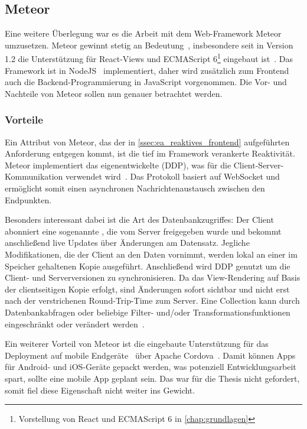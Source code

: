 \subsection{Meteor}
\label{ssec:el_meteor}

Eine weitere Überlegung war es die Arbeit mit dem Web-Framework Meteor
umzusetzen.  Meteor gewinnt stetig an Bedeutung~\cite{hotframeworks},
insbesondere seit in Version 1.2 die Unterstützung für React-Views und
ECMAScript 6\footnote{Vorstellung von React und ECMAScript 6 in
\cref{chap:grundlagen}} eingebaut ist~\cite{meteor12}.  Das Framework ist in
NodeJS~\cite{nodejs} implementiert, daher wird zusätzlich zum Frontend auch die
Backend-Programmierung in JavaScript vorgenommen.  Die Vor- und Nachteile von
Meteor sollen nun genauer betrachtet werden.

\subsubsection{Vorteile}
\label{sssec:elm_vorteile}

Ein Attribut von Meteor, das der in \cref{ssec:ea_reaktives_frontend}
aufgeführten Anforderung entgegen kommt, ist die tief im Framework verankerte
Reaktivität.  Meteor implementiert das eigenentwickelte
 (DDP), was für die
Client-Server-Kommunikation verwendet wird~\cite{ddp}.  Das Protokoll basiert
auf WebSocket und ermöglicht somit einen asynchronen Nachrichtenaustausch
zwischen den Endpunkten.

Besonders interessant dabei ist die Art des Datenbankzugriffes:  Der Client
abonniert eine sogenannte , die vom Server
freigegeben wurde und bekommt anschließend live Updates über Änderungen am
Datensatz.  Jegliche Modifikationen, die der Client an den Daten vornimmt,
werden lokal an einer im Speicher gehaltenen Kopie ausgeführt.  Anschließend
wird DDP genutzt um die Client- und Serverversionen zu synchronisieren.  Da das
View-Rendering auf Basis der clientseitigen Kopie erfolgt, sind Änderungen
sofort sichtbar und nicht erst nach der verstrichenen Round-Trip-Time zum
Server.  Eine Collection kann durch Datenbankabfragen oder beliebige Filter-
und/oder Transformationsfunktionen eingeschränkt oder verändert
werden~\cite{meteordoc}.

Ein weiterer Vorteil von Meteor ist die eingebaute Unterstützung für das
Deployment auf mobile Endgeräte~\cite{meteormobile} über Apache
Cordova~\cite{cordova}.  Damit können Apps für Android- und iOS-Geräte gepackt
werden, was potenziell Entwicklungsarbeit spart, sollte eine mobile App geplant
sein.  Das war für die Thesis nicht gefordert, somit fiel diese Eigenschaft
nicht weiter ins Gewicht.

